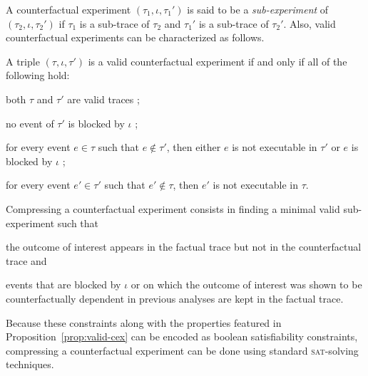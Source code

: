 A counterfactual experiment $(\tau_1, \iota, \tau_1')$ is said to be a
\emph{sub-experiment} of $(\tau_2, \iota, \tau_2')$ if $\tau_1$ is a
sub-trace of $\tau_2$ and $\tau_1'$ is a sub-trace of $\tau_2'$. Also,
valid counterfactual experiments can be characterized as follows.

\begin{proposition}%
  \label{prop:valid-cex}
  A triple $(\tau, \iota, \tau')$ is a valid counterfactual experiment
  if and only if all of the following hold:
  \begin{inparaenum}[(1)]
  \item \label{valid-cex:valid-traces} both $\tau$ and $\tau'$ are
    valid traces ;
  \item \label{valid-cex:no-blocking} no event of $\tau'$ is blocked
    by $\iota$ ;
  \item \label{valid-cex:co-occur} for every event $e \in \tau$ such
    that $e \notin \tau'$, then either $e$ is not executable in
    $\tau'$ or $e$ is blocked by $\iota$ ;
  \item \label{valid-cex:co-occur2} for every event $e' \in \tau'$
    such that $e' \notin \tau$, then $e'$ is not executable in $\tau$.
  \end{inparaenum}
\end{proposition}

\noindent Compressing a counterfactual experiment consists in finding
a minimal valid sub-experiment such that
\begin{inparaenum}[(i)]
\item the outcome of interest appears in the factual trace but not in
  the counterfactual trace and
\item events that are blocked by $\iota$ or on which the outcome of
  interest was shown to be counterfactually dependent in previous
  analyses are kept in the factual trace.
\end{inparaenum}
Because these constraints along with the properties featured in
Proposition~\ref{prop:valid-cex} can be encoded as boolean
satisfiability constraints, compressing a counterfactual experiment
can be done using standard \textsc{sat}-solving techniques.

